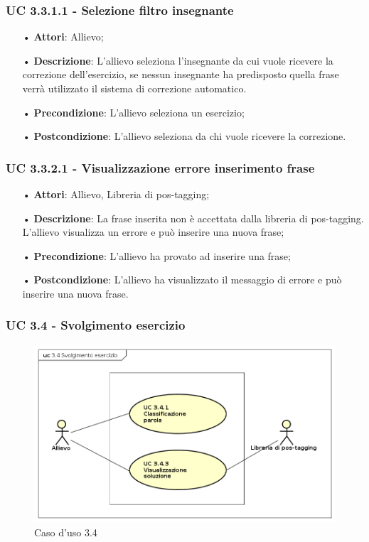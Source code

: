 \subsubsection{UC 3.3.1.1 - Selezione filtro insegnante}

\begin{itemize}
\item[•]\textbf{Attori}: Allievo;
\item[•]\textbf{Descrizione}: L'allievo seleziona l'insegnante da cui vuole ricevere la correzione dell'esercizio, se nessun insegnante ha predisposto quella frase verrà utilizzato il sistema di correzione automatico. %
\item[•]\textbf{Precondizione}: L'allievo seleziona un esercizio;
\item[•]\textbf{Postcondizione}: L'allievo seleziona da chi vuole ricevere la correzione.
\end{itemize}


\subsubsection{UC 3.3.2.1 - Visualizzazione errore inserimento frase}
\begin{itemize}
\item[•]\textbf{Attori}: Allievo, Libreria di pos-tagging;
\item[•]\textbf{Descrizione}: La frase inserita non è accettata dalla libreria di pos-tagging. L'allievo visualizza un errore e può inserire una nuova frase;
\item[•]\textbf{Precondizione}: L'allievo ha provato ad inserire una frase;
\item[•]\textbf{Postcondizione}: L'allievo ha visualizzato il messaggio di errore e può inserire una nuova frase.
\end{itemize}

\subsubsection{UC 3.4 - Svolgimento esercizio}

\begin{figure}[H]
\centering
\includegraphics[width=17cm]{img/UC34.png} 
\caption{Caso d'uso 3.4}\label{fig:34}
\end{figure}

